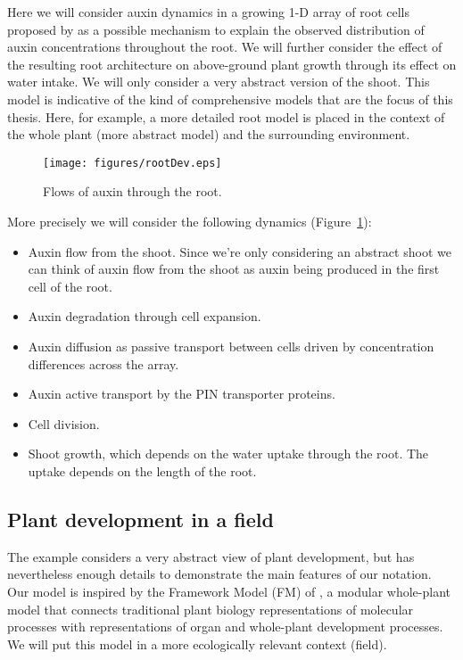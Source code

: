 \documentclass[phd]{infthesis}
\begin{document}
Here we will consider auxin dynamics in a growing 1-D array of root cells
proposed by \citep{mironova_plausible_2010} as a possible mechanism to explain
the observed distribution of auxin concentrations throughout the root. We will
further consider the effect of the resulting root architecture on above-ground
plant growth through its effect on water intake. We will only consider a very
abstract version of the shoot. This model is indicative of the kind of
comprehensive models that are the focus of this thesis. Here, for example, a
more detailed root model is placed in the context of the whole plant (more
abstract model) and the surrounding environment.

\begin{figure}
\centering
\texttt{[image: figures/rootDev.eps]}
\caption{Flows of auxin through the root.}
\label{fig:rootDev}
\end{figure}

More precisely we will consider the following dynamics
(Figure~\ref{fig:rootDev}):
\begin{itemize}
\item Auxin flow from the shoot. Since we're only considering an abstract shoot
we can think of auxin flow from the shoot as auxin being produced in the first
cell of the root.
\item Auxin degradation through cell expansion.
\item Auxin diffusion as passive transport between cells driven by concentration
differences across the array.
\item Auxin active transport by the PIN transporter proteins.
\item Cell division.
\item Shoot growth, which depends on the water uptake through the root. The
uptake depends on the length of the root.
\end{itemize}


\subsection{Plant development in a field}
The example considers a very abstract view of plant development, but has
nevertheless enough details to demonstrate the main features of our
notation. Our model is inspired by the Framework Model (FM) of
\citet{chew_multiscale_2014}, a modular whole-plant model that connects
traditional plant biology representations of molecular processes with
representations of organ and whole-plant development processes. We will put this
model in a more ecologically relevant context (field).
\end{document}
